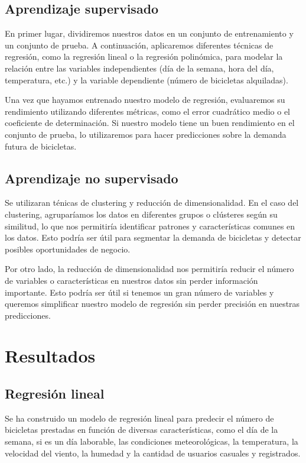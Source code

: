 \documentclass{wsdcr}
\begin{document}
\subsection{Aprendizaje supervisado}
En primer lugar, dividiremos nuestros datos en un conjunto de entrenamiento y un conjunto de prueba. A continuación, aplicaremos diferentes técnicas de regresión, como la regresión lineal o la regresión polinómica, para modelar la relación entre las variables independientes (día de la semana, hora del día, temperatura, etc.) y la variable dependiente (número de bicicletas alquiladas).

Una vez que hayamos entrenado nuestro modelo de regresión, evaluaremos su rendimiento utilizando diferentes métricas, como el error cuadrático medio o el coeficiente de determinación. Si nuestro modelo tiene un buen rendimiento en el conjunto de prueba, lo utilizaremos para hacer predicciones sobre la demanda futura de bicicletas.

\subsection{Aprendizaje no supervisado}
Se utilizaran ténicas de clustering y reducción de dimensionalidad.
En el caso del clustering, agruparíamos los datos en diferentes grupos o clústeres según su similitud, lo que nos permitiría identificar patrones y características comunes en los datos. Esto podría ser útil para segmentar la demanda de bicicletas y detectar posibles oportunidades de negocio.

Por otro lado, la reducción de dimensionalidad nos permitiría reducir el número de variables o características en nuestros datos sin perder información importante. Esto podría ser útil si tenemos un gran número de variables y queremos simplificar nuestro modelo de regresión sin perder precisión en nuestras predicciones.

\section{Resultados}
\subsection{Regresión lineal}
Se ha construido un modelo de regresión lineal para predecir el número de bicicletas prestadas en función de diversas características, como el día de la semana, si es un día laborable, las condiciones meteorológicas, la temperatura, la velocidad del viento, la humedad y la cantidad de usuarios casuales y registrados.
\end{document}
